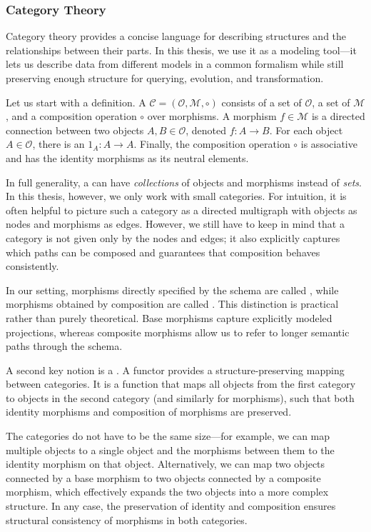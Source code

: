 \subsubsection{Category Theory}

Category theory provides a concise language for describing structures and the relationships between their parts. In this thesis, we use it as a modeling tool---it lets us describe data from different models in a common formalism while still preserving enough structure for querying, evolution, and transformation.

Let us start with a definition. A  $\mathcal{C} = (\mathcal{O}, \mathcal{M}, \circ)$ consists of a set of  $\mathcal{O}$, a set of  $\mathcal{M}$, and a composition operation $\circ$ over morphisms. A morphism $f \in \mathcal{M}$ is a directed connection between two objects $A, B \in \mathcal{O}$, denoted $f : A \to B$. For each object $A \in \mathcal{O}$, there is an  $1_A : A \to A$. Finally, the composition operation $\circ$ is associative and has the identity morphisms as its neutral elements.

In full generality, a  can have \emph{collections} of objects and morphisms instead of \emph{sets}. In this thesis, however, we only work with small categories. For intuition, it is often helpful to picture such a category as a directed multigraph with objects as nodes and morphisms as edges. However, we still have to keep in mind that a category is not given only by the nodes and edges; it also explicitly captures which paths can be composed and guarantees that composition behaves consistently.

In our setting, morphisms directly specified by the schema are called , while morphisms obtained by composition are called . This distinction is practical rather than purely theoretical. Base morphisms capture explicitly modeled projections, whereas composite morphisms allow us to refer to longer semantic paths through the schema.

A second key notion is a . A functor provides a structure-preserving mapping between categories. It is a function that maps all objects from the first category to objects in the second category (and similarly for morphisms), such that both identity morphisms and composition of morphisms are preserved.

The categories do not have to be the same size---for example, we can map multiple objects to a single object and the morphisms between them to the identity morphism on that object. Alternatively, we can map two objects connected by a base morphism to two objects connected by a composite morphism, which effectively expands the two objects into a more complex structure. In any case, the preservation of identity and composition ensures structural consistency of morphisms in both categories. 

